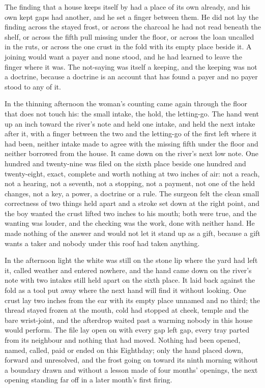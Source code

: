 The finding that a house keeps itself by  had a place of its own already, and his own kept gaps had another, and he set a finger between them. He did not lay the finding across the stayed frost, or across the charcoal he had not read beneath the shelf, or across the fifth pull missing under the floor, or across the loan uncalled in the ruts, or across the one crust in the fold with its empty place beside it. A joining would want a payer and none stood, and he had learned to leave the finger where it was. The not-saying was itself a keeping, and the keeping was not a doctrine, because a doctrine is an account that has found a payer and no payer stood to any of it.

In the thinning afternoon the woman's counting came again through the floor that does not touch his: the small intake, the hold, the letting-go. The hand went up an inch toward the river's note and held one intake, and held the next intake after it, with a finger between the two and the letting-go of the first left where it had been, neither intake made to agree with the missing fifth under the floor and neither borrowed from the house. It came down on the river's next low note. One hundred and twenty-nine was filed on the sixth place beside one hundred and twenty-eight, exact, complete and worth nothing at two inches of air: not a reach, not a hearing, not a seventh, not a stopping, not a payment, not one of the held changes, not a key, a power, a doctrine or a rule. The surgeon felt the clean small correctness of two things held apart and a stroke set down at the right point, and the boy wanted the crust lifted two inches to his mouth; both were true, and the wanting was louder, and the checking was the work, done with neither hand. He made nothing of the answer and would not let it stand up as a gift, because a gift wants a taker and nobody under this roof had taken anything.

In the afternoon light the white was still on the stone lip where the yard had left it, called weather and entered nowhere, and the hand came down on the river's note with two intakes still held apart on the sixth place. It laid back against the fold as a tool put away where the next hand will find it without looking. One crust lay two inches from the ear with its empty place unnamed and no third; the thread stayed frozen at the mouth, cold had stopped at cheek, temple and the bare wrist-joint, and the afterdrop waited past a warming nobody in this house would perform. The file lay open on  with every gap left gap, every tray parted from its neighbour and nothing that had moved. Nothing had been opened, named, called, paid or ended on this Eighthday; only the hand placed down, forward and unresolved, and the frost going on toward its ninth morning without a boundary drawn and without a lesson made of four months' openings, the next opening standing far off in a later month's first firing.
